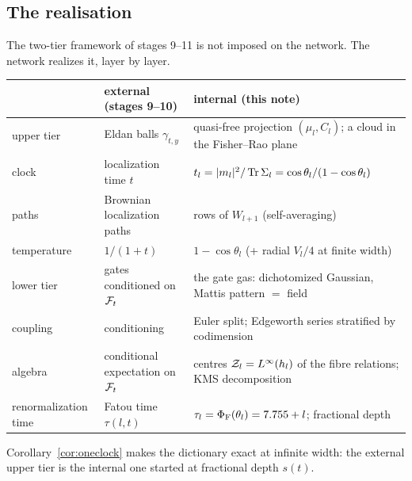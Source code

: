 \label{sec:synthesis}
\subsection{The realisation}
The two-tier framework of stages 9--11 is not imposed on the network. The network realizes it, layer by layer.
\begin{center}\small
\begin{tabular}{>{\raggedright\arraybackslash}p{4.2cm}>{\raggedright\arraybackslash}p{5.1cm}>{\raggedright\arraybackslash}p{5.3cm}}\toprule
 & external (stages 9--10) & internal (this note)\\\midrule
upper tier & Eldan balls $\gamma_{t,y}$ & quasi-free projection $(\mu_l,C_l)$; a cloud in the Fisher--Rao plane\\
clock & localization time $t$ & $t_l=|m_l|^2/\operatorname{Tr}\Sigma_l=\cos\theta_l/(1-\cos\theta_l)$\\
paths & Brownian localization paths & rows of $W_{l+1}$ (self-averaging)\\
temperature & $1/(1+t)$ & $1-\cos\theta_l$ (+ radial $V_l/4$ at finite width)\\
lower tier & gates conditioned on $\mathcal F_t$ & the gate gas: dichotomized Gaussian, Mattis pattern $=$ field\\
coupling & conditioning & Euler split; Edgeworth series stratified by codimension\\
algebra & conditional expectation on $\mathcal F_t$ & centres $\mathcal Z_l=L^\infty(h_l)$ of the fibre relations; KMS decomposition\\
renormalization time & Fatou time $\tau(l,t)$ & $\tau_l=\Phi_{\mathrm F}(\theta_l)=7.755+l$; fractional depth\\\bottomrule
\end{tabular}
\end{center}
Corollary~\ref{cor:oneclock} makes the dictionary exact at infinite width: the external upper tier is the internal one started at
fractional depth $s(t)$.


